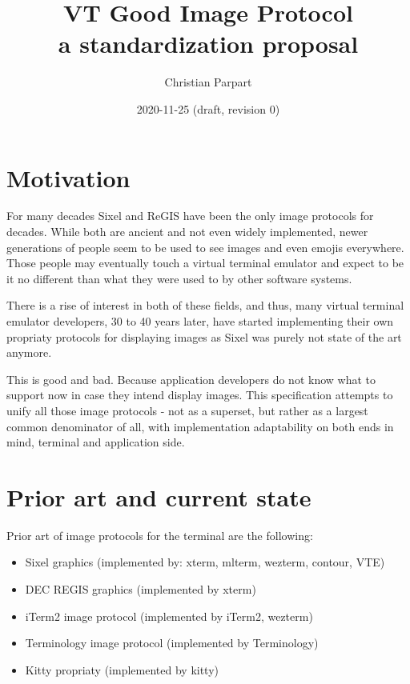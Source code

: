 \documentclass{article}
\title{VT Good Image Protocol \\
a standardization proposal}
\author{Christian Parpart}
\date{2020-11-25 (draft, revision 0)}
\begin{document}
\maketitle

\tableofcontents


\section{Motivation} %

For many decades Sixel and ReGIS have been the only image protocols for decades. While both are
ancient and not even widely implemented, newer generations of people seem to be used to see images
and even emojis everywhere. Those people may eventually touch a virtual terminal emulator
and expect to be it no different than what they were used to by other software systems.

There is a rise of interest in both of these fields, and thus, many virtual terminal emulator
developers, 30 to 40 years later, have started implementing their own propriaty protocols
for displaying images as Sixel was purely not state of the art anymore.

This is good and bad. Because application developers do not know what to support now in case they
intend display images. This specification attempts to unify all those image protocols - not
as a superset, but rather as a largest common denominator of all, with implementation adaptability
on both ends in mind, terminal and application side.

\section{Prior art and current state} %

Prior art of image protocols for the terminal are the following:

\begin{itemize}
    \item Sixel graphics (implemented by: xterm, mlterm, wezterm, contour, VTE)
    \item DEC REGIS graphics (implemented by xterm)
    \item iTerm2 image protocol (implemented by iTerm2, wezterm)
    \item Terminology image protocol (implemented by Terminology)
    \item Kitty propriaty (implemented by kitty)
\end{itemize}
\end{document}

